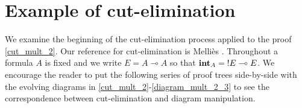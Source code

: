 \documentclass[english,letter paper,12pt,reqno]{article}
\theoremstyle{example}
\def\inta{\bold{int}}
\begin{document}
\appendix

\section{Example of cut-elimination}\label{section:appendix_cut_elim}

We examine the beginning of the cut-elimination process applied to the proof \eqref{cut_mult_2}. Our reference for cut-elimination is Melli\`{e}s \cite[\S 3.3]{mellies}. Throughout a formula $A$ is fixed and we write $E = A \multimap A$ so that $\inta_A = {!}E \multimap E$. We encourage the reader to put the following series of proof trees side-by-side with the evolving diagrams in \eqref{cut_mult_2}-\eqref{diagram_mult_2_3} to see the correspondence between cut-elimination and diagram manipulation.
\end{document}
